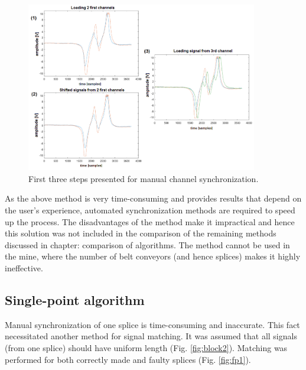 \documentclass[applsci,article,preprint,moreauthors,pdftex]{Definitions/mdpi}
\begin{document}
\begin{figure}[ht!]
\centering
\includegraphics[width=0.9\textwidth]{figs/manual1.png}
\caption{First three steps presented for manual channel synchronization.}
\label{fig:manual1}
\end{figure}

As the above method is very time-consuming and provides results that depend on the user’s experience, automated synchronization methods are required to speed up the process. The disadvantages of the method make it impractical and hence this solution was not included in the comparison of the remaining methods discussed in chapter: comparison of algorithms. The method cannot be used in the mine, where the number of belt conveyors (and hence splices) makes it highly ineffective.

\subsection{Single-point algorithm}

Manual synchronization of one splice is time-consuming and inaccurate. This fact necessitated another method for signal matching. It was assumed that all signals (from one splice) should have uniform length (Fig. \ref{fig:block2}). Matching was performed for both correctly made and faulty splices (Fig. \ref{fig:fp1}).
\end{document}
